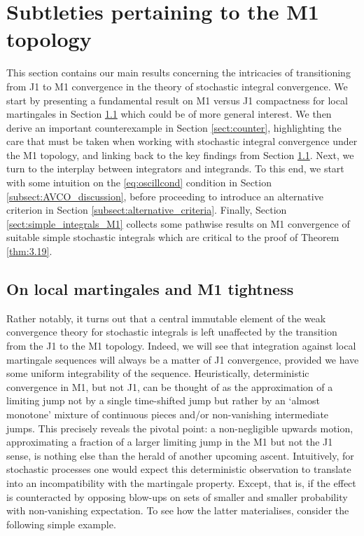 \documentclass[11pt]{article}
\theoremstyle{definition}\newtheorem{example}[theorem]{Example}
\theoremstyle{definition}\newtheorem{counterexample}[theorem]{Counterexample}
\theoremstyle{definition}\newtheorem{remark}[theorem]{Remark}
\theoremstyle{definition}\newtheorem{defi}[theorem]{Definition}
\numberwithin{equation}{section}
\renewcommand{\|}{\; : \, \;}											%
\begin{document}
\section{Subtleties pertaining to the M1 topology}
\label{sect:M1_subtleties}

This section contains our main results concerning the intricacies of transitioning from J1 to M1 convergence in the theory of stochastic integral convergence. We start by presenting a fundamental result on M1 versus J1 compactness for local martingales in Section \ref{sect:M1_martingales_and_counterex} which could be of more general interest. We then derive an important counterexample in Section \ref{sect:counter}, highlighting the care that must be taken when working with stochastic integral convergence under the M1 topology, and linking back to the key findings from Section \ref{sect:M1_martingales_and_counterex}. Next, we turn to the interplay between integrators and integrands. To this end, we start with some intuition on the \eqref{eq:oscillcond} condition in Section \ref{subsect:AVCO_discussion}, before proceeding to introduce an alternative criterion in Section \ref{subsect:alternative_criteria}. Finally, Section \ref{sect:simple_integrals_M1} collects some pathwise results on M1 convergence of suitable simple stochastic integrals which are critical to the proof of Theorem \ref{thm:3.19}.



\subsection{On local martingales and M1 tightness}\label{sect:M1_martingales_and_counterex} 

Rather notably, it turns out that a central immutable element of the weak convergence theory for stochastic integrals is left unaffected by the transition from the J1 to the M1 topology. Indeed, we will see that integration against local martingale sequences will always be a matter of J1 convergence, provided we have some uniform integrability of the sequence. Heuristically, deterministic convergence in M1, but not J1, can be thought of as the approximation of a limiting jump not by a single time-shifted jump but rather by an `almost monotone' mixture of continuous pieces and/or non-vanishing intermediate jumps. This precisely reveals the pivotal point: a non-negligible upwards motion, approximating a fraction of a larger limiting jump in the M1 but not the J1 sense, is nothing else than the herald of another upcoming ascent. Intuitively, for stochastic processes one would expect this deterministic observation to translate into an incompatibility with the martingale property. Except, that is, if the effect is counteracted by opposing blow-ups on sets of smaller and smaller probability with non-vanishing expectation. To see how the latter materialises, consider the following simple example.
\end{document}
